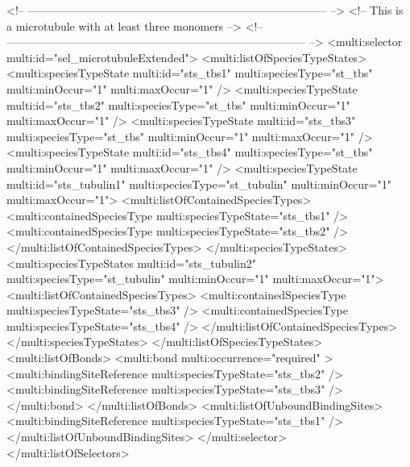 \begin{example}
<!-- -------------------------------------------------------------------------------- -->
<!-- This is a microtubule with at least three monomers                               -->
<!-- -------------------------------------------------------------------------------- -->
      <multi:selector multi:id="sel_microtubuleExtended">
        <multi:listOfSpeciesTypeStates>
          <multi:speciesTypeState multi:id="sts_tbs1" multi:speciesType="st_tbs" 
                                   multi:minOccur="1" multi:maxOccur="1" />
          <multi:speciesTypeState multi:id="sts_tbs2" multi:speciesType="st_tbs" 
                                   multi:minOccur="1" multi:maxOccur="1" />
          <multi:speciesTypeState multi:id="sts_tbs3" multi:speciesType="st_tbs" 
                                   multi:minOccur="1" multi:maxOccur="1" />
          <multi:speciesTypeState multi:id="sts_tbs4" multi:speciesType="st_tbs" 
                                   multi:minOccur="1" multi:maxOccur="1" />
          <multi:speciesTypeState multi:id="sts_tubulin1" multi:speciesType="st_tubulin" 
                                   multi:minOccur="1" multi:maxOccur="1">
            <multi:listOfContainedSpeciesTypes>
              <multi:containedSpeciesType multi:speciesTypeState="sts_tbs1" /> 
              <multi:containedSpeciesType multi:speciesTypeState="sts_tbs2" />
            </multi:listOfContainedSpeciesTypes>
          </multi:speciesTypeStates>
          <multi:speciesTypeStates multi:id="sts_tubulin2" multi:speciesType="st_tubulin" 
                                   multi:minOccur="1" multi:maxOccur="1">
            <multi:listOfContainedSpeciesTypes>
              <multi:containedSpeciesType multi:speciesTypeState="sts_tbs3" /> 
              <multi:containedSpeciesType multi:speciesTypeState="sts_tbs4" />
            </multi:listOfContainedSpeciesTypes>
          </multi:speciesTypeStates>
        </multi:listOfSpeciesTypeStates>
        <multi:listOfBonds>
          <multi:bond multi:occurrence="required" >
            <multi:bindingSiteReference multi:speciesTypeState="sts_tbs2" />
            <multi:bindingSiteReference multi:speciesTypeState="sts_tbs3" />
          </multi:bond>
        </multi:listOfBonds>
        <multi:listOfUnboundBindingSites>
          <multi:bindingSiteReference multi:speciesTypeState="sts_tbs1" />
        </multi:listOfUnboundBindingSites>
      </multi:selector>
    </multi:listOfSelectors>


\end{example}
